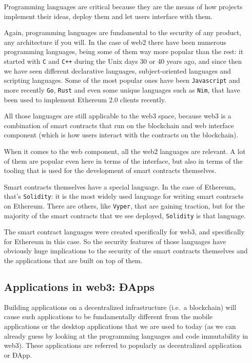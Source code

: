 Programming languages are critical because they are the means of how
projects implement their ideas, deploy them and let users interface with
them.

Again, programming languages are fundamental to the security of any
product, any architecture if you will. In the case of web2 there have
been numerous programming languages, being some of them way more popular
than the rest: it started with \texttt{C} and \texttt{C++} during the
Unix days 30 or 40 years ago, and since then we have seen different
declarative languages, subject-oriented languages and scripting
languages. Some of the most popular ones have been \texttt{Javascript}
and more recently \texttt{Go}, \texttt{Rust} and even some unique
languages such as \texttt{Nim}, that have been used to implement
Ethereum 2.0 clients recently.

All those languages are still applicable to the web3 space, because web3
is a combination of smart contracts that run on the blockchain and web
interface component (which is how users interact with the contracts on
the blockchain).

When it comes to the web component, all the web2 languages are relevant.
A lot of them are popular even here in terms of the interface, but also
in terms of the tooling that is used for the development of smart
contracts themselves.

Smart contracts themselves have a special language. In the case of
Ethereum, that's \texttt{Solidity}: it is the most widely used language
for writing smart contracts on Ethereum. There are others, like
\texttt{Vyper}, that are gaining traction, but for the majority of the
smart contracts that we see deployed, \texttt{Solidity} is that
language.

The smart contract languages were created specifically for web3, and
specifically for Ethereum in this case. So the security features of
those languages have obviously huge implications to the security of the
smart contracts themselves and the applications that are built on top of
them.

\subsection{Applications in web3:
ÐApps}\label{applications-in-web3-uxf0apps}

Building applications on a decentralized infrastructure (i.e.~a
blockchain) will cause such applications to be fundamentally different
from the mobile applications or the desktop applications that we are
used to today (as we can already guess by looking at the programming
languages and code immutability in web3). These applications are
referred to popularly as decentralized application or ÐApp.

